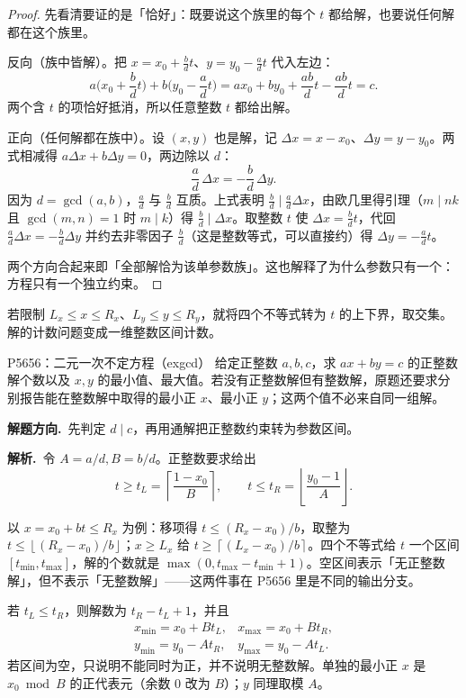 \documentclass[UTF8,a4paper,11pt,oneside,openany,fontset=fandol]{ctexbook}
\theoremstyle{definition}
\newcommand{\floor}[1]{\left\lfloor #1\right\rfloor}
\newcommand{\ceil}[1]{\left\lceil #1\right\rceil}
\newcommand{\sol}{\par\noindent\textbf{解析.}\ }
\newcommand{\hint}{\par\noindent\textbf{解题方向.}\ }
\begin{document}
\begin{proof}
先看清要证的是「恰好」：既要说这个族里的每个 $t$ 都给解，也要说任何解都在这个族里。

反向（族中皆解）。把 $x=x_0+\frac bd t$、$y=y_0-\frac ad t$ 代入左边：
\[
 a\Big(x_0+\frac bd t\Big)+b\Big(y_0-\frac ad t\Big)=ax_0+by_0+\frac{ab}{d}t-\frac{ab}{d}t=c.
\]
两个含 $t$ 的项恰好抵消，所以任意整数 $t$ 都给出解。

正向（任何解都在族中）。设 $(x,y)$ 也是解，记 $\Delta x=x-x_0$、$\Delta y=y-y_0$。两式相减得 $a\Delta x+b\Delta y=0$，两边除以 $d$：
\[
 \frac ad\,\Delta x=-\frac bd\,\Delta y.
\]
因为 $d=\gcd(a,b)$，$\frac ad$ 与 $\frac bd$ 互质。上式表明 $\frac bd\mid\frac ad\Delta x$，由欧几里得引理（$m\mid nk$ 且 $\gcd(m,n)=1$ 时 $m\mid k$）得 $\frac bd\mid\Delta x$。取整数 $t$ 使 $\Delta x=\frac bd t$，代回 $\frac ad\Delta x=-\frac bd\Delta y$ 并约去非零因子 $\frac bd$（这是整数等式，可以直接约）得 $\Delta y=-\frac ad t$。

两个方向合起来即「全部解恰为该单参数族」。这也解释了为什么参数只有一个：方程只有一个独立约束。
\end{proof}
若限制 $L_x\le x\le R_x$、$L_y\le y\le R_y$，就将四个不等式转为 $t$ 的上下界，取交集。解的计数问题变成一维整数区间计数。

\begin{problem}{P5656：二元一次不定方程（exgcd）}
给定正整数 $a,b,c$，求 $ax+by=c$ 的正整数解个数以及 $x,y$ 的最小值、最大值。若没有正整数解但有整数解，原题还要求分别报告能在整数解中取得的最小正 $x$、最小正 $y$；这两个值不必来自同一组解。
\end{problem}
\hint 先判定 $d\mid c$，再用通解把正整数约束转为参数区间。

\sol 令 $A=a/d,B=b/d$。正整数要求给出
\[
 t\ge t_L=\ceil{\frac{1-x_0}{B}},\qquad
 t\le t_R=\floor{\frac{y_0-1}{A}}.
\]

\begin{tip}
以 $x=x_0+bt\le R_x$ 为例：移项得 $t\le(R_x-x_0)/b$，取整为 $t\le\floor{(R_x-x_0)/b}$；$x\ge L_x$ 给 $t\ge\ceil{(L_x-x_0)/b}$。四个不等式给 $t$ 一个区间 $[t_{\min},t_{\max}]$，解的个数就是 $\max(0,t_{\max}-t_{\min}+1)$。空区间表示「无正整数解」，但不表示「无整数解」——这两件事在 P5656 里是不同的输出分支。
\end{tip}

若 $t_L\le t_R$，则解数为 $t_R-t_L+1$，并且
\[
\begin{array}{ll}
x_{\min}=x_0+Bt_L,&x_{\max}=x_0+Bt_R,\\
y_{\min}=y_0-At_R,&y_{\max}=y_0-At_L.
\end{array}
\]
若区间为空，只说明不能同时为正，并不说明无整数解。单独的最小正 $x$ 是 $x_0\bmod B$ 的正代表元（余数 $0$ 改为 $B$）；$y$ 同理取模 $A$。
\end{document}
